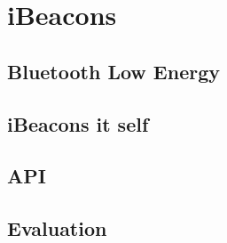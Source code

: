 \chapter{iBeacons} \label{chap:ibeacons}

\section{Bluetooth Low Energy}

\section{iBeacons it self}

\section{API}

\section{Evaluation}


